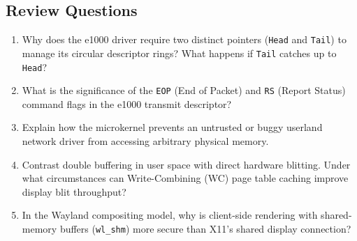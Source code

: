 \subsection*{Review Questions}
\begin{enumerate}
    \item Why does the e1000 driver require two distinct pointers (\texttt{Head} and \texttt{Tail}) to manage its circular descriptor rings? What happens if \texttt{Tail} catches up to \texttt{Head}?
    \item What is the significance of the \texttt{EOP} (End of Packet) and \texttt{RS} (Report Status) command flags in the e1000 transmit descriptor?
    \item Explain how the microkernel prevents an untrusted or buggy userland network driver from accessing arbitrary physical memory.
    \item Contrast double buffering in user space with direct hardware blitting. Under what circumstances can Write-Combining (WC) page table caching improve display blit throughput?
    \item In the Wayland compositing model, why is client-side rendering with shared-memory buffers (\texttt{wl\_shm}) more secure than X11's shared display connection?
\end{enumerate}
